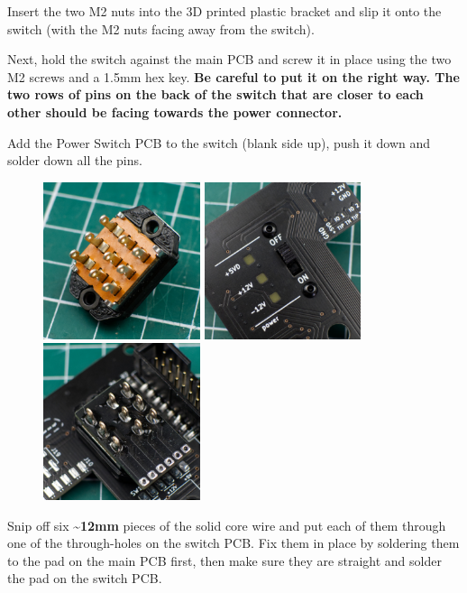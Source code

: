 \documentclass[12pt, a4paper]{article}
\begin{document}
Insert the two M2 nuts into the 3D printed plastic bracket and slip it onto the switch (with
the M2 nuts facing away from the switch).

Next, hold the switch against the main PCB and screw it in place using the two M2 screws and a
1.5mm hex key. \textbf{Be careful to put it on the right way. The two rows of pins on the back
of the switch that are closer to each other should be facing towards the power connector.}

Add the Power Switch PCB to the switch (blank side up), push it down and solder down all the
pins.

\begin{figure}[H]
    \centering
    \includegraphics[width=46mm]{images/section_3-1_bracket.jpg}
    \hspace{2mm}
    \includegraphics[width=46mm]{images/section_3-1_screwed.jpg}
    \hspace{2mm}
    \includegraphics[width=46mm]{images/section_3-1_soldered.jpg}
\end{figure}

Snip off six \textbf{\textasciitilde12mm} pieces of the solid core wire and put each of them through
one of the through-holes on the switch PCB. Fix them in place by soldering them to the pad
on the main PCB first, then make sure they are straight and solder the pad on the switch PCB.
\end{document}
